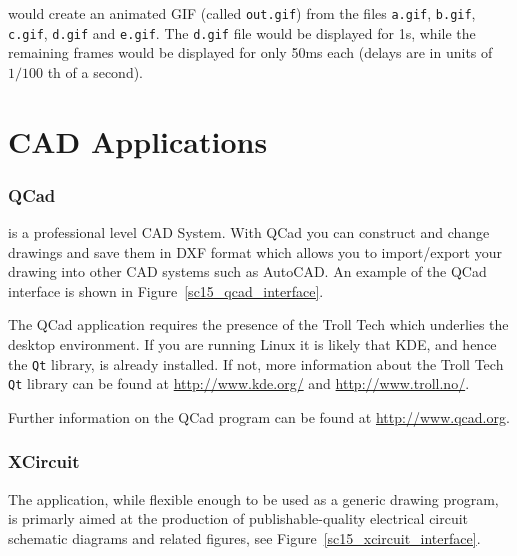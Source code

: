 \documentclass[twoside,11pt]{starlink}
\begin{document}
would create an animated GIF (called \texttt{out.gif}) from the files
\texttt{a.gif}, \texttt{b.gif}, \texttt{c.gif}, \texttt{d.gif} and \texttt{e.gif}.
The \texttt{d.gif} file would be displayed for 1s, while the remaining
frames would be displayed for only 50ms each (delays are in units of
$1/100$ th of a second).

\section{CAD Applications\label{sc15_qcad}}

\subsubsection{QCad}

 is a professional level
CAD System. With QCad you can construct and change drawings and save
them in DXF format which allows you to import/export your drawing into
other CAD systems such as AutoCAD. An example of the QCad interface is
shown in Figure~\ref{sc15_qcad_interface}.


The QCad application requires the presence of the Troll Tech
 which
underlies the  desktop
environment. If you are running Linux it is likely that KDE, and hence
the \texttt{Qt} library, is already installed. If not, more information
about the Troll Tech \texttt{Qt} library can be found at
\url{http://www.kde.org/} and
\url{http://www.troll.no/}.

Further information on the QCad program can be found at \url{http://www.qcad.org}.

\subsubsection{XCircuit}

The
application, while flexible enough to be used as a generic drawing
program, is primarly aimed at the production of publishable-quality
electrical circuit schematic diagrams and related figures, see
Figure~\ref{sc15_xcircuit_interface}.
\end{document}
